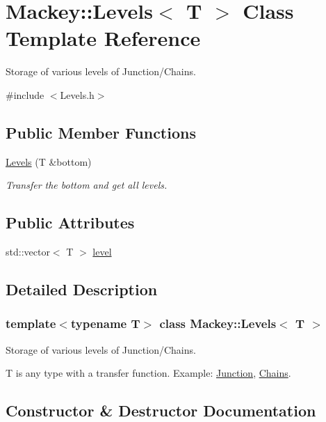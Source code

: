 \hypertarget{classMackey_1_1Levels}{}\section{Mackey\+:\+:Levels$<$ T $>$ Class Template Reference}
\label{classMackey_1_1Levels}


Storage of various levels of Junction/\+Chains.  




{\ttfamily \#include $<$Levels.\+h$>$}

\subsection*{Public Member Functions}
\begin{DoxyCompactItemize}
\item 
\hyperlink{classMackey_1_1Levels_a450b9aba828f03dd340e89169a4bd9e0}{Levels} (T \&bottom)
\begin{DoxyCompactList}\small\item\em Transfer the bottom and get all levels. \end{DoxyCompactList}\end{DoxyCompactItemize}
\subsection*{Public Attributes}
\begin{DoxyCompactItemize}
\item 
std\+::vector$<$ T $>$ \hyperlink{classMackey_1_1Levels_af9a1391f683685ae464829b9b32162c8}{level}
\end{DoxyCompactItemize}


\subsection{Detailed Description}
\subsubsection*{template$<$typename T$>$\newline
class Mackey\+::\+Levels$<$ T $>$}

Storage of various levels of Junction/\+Chains. 

T is any type with a transfer function. Example\+: \hyperlink{classMackey_1_1Junction}{Junction}, \hyperlink{classMackey_1_1Chains}{Chains}. 

\subsection{Constructor \& Destructor Documentation}
\mbox{\label{classMackey_1_1Levels_a450b9aba828f03dd340e89169a4bd9e0}} 
